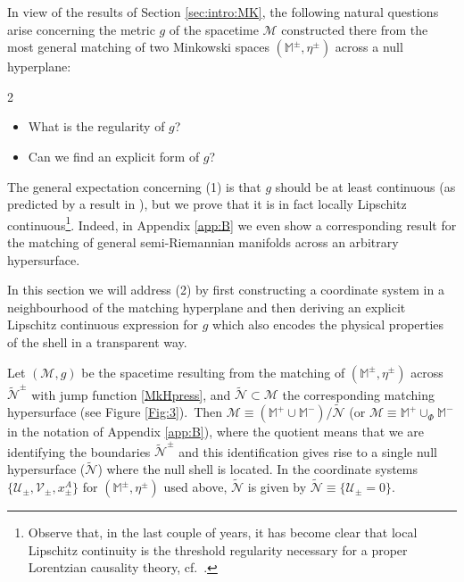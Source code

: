 \documentclass[11pt]{article}
\numberwithin{equation}{section}
\def\Mkp{\mathbb{M}^+}
\def\Mkm{\mathbb{M}^-}
\def\Mkpm{\mathbb{M}^{\pm}}
\def\flatpm{\eta^{\pm}}
\newcommand\N{\mathcal N}
\newcommand\M{\mathcal M}
\newcommand{\lp}{\left(}
\newcommand{\rp}{\right)}
\newcommand{\cu}{\mathcal{U}}
\newcommand{\cv}{\mathcal{V}}
\newcommand{\nullhyp}{\widetilde{\N}}
\begin{document}
In view of the results of Section \ref{sec:intro:MK}, the following natural questions arise 
concerning the metric $g$ of the spacetime $\M$ constructed there from the most general matching of two Minkowski spaces $(\Mkpm,\flatpm)$ across a null hyperplane:
\begin{multicols}{2}
\begin{itemize}\itemsep0cm
    \item[(1)] What is the regularity of $g$? 
    \item[(2)] Can we find an explicit form of $g$?
\end{itemize}
\end{multicols}
The general expectation concerning (1) is that $g$ should be at least continuous (as predicted by a result in \cite{clarke1987junction}), but we prove that it is in fact locally Lipschitz continuous\footnote{Observe that, in the last couple of years, it has become clear that local Lipschitz continuity is the threshold regularity necessary for a proper Lorentzian causality theory, cf.\ \cite{CG:12,GKSS:20}.}. Indeed, in Appendix \ref{app:B} we even show a corresponding result for the matching of general semi-Riemannian manifolds across an arbitrary hypersurface. 

In this section we will address (2) 
by first constructing a coordinate system in a neighbourhood of the matching hyperplane and then deriving an explicit Lipschitz continuous expression for $g$ which also encodes 
the physical properties of the shell in a transparent way. 


Let $(\M,g)$ be the spacetime resulting from the matching of $(\Mkpm, \flatpm)$ across $\nullhyp^{\pm}$ with jump function \eqref{MkHpress}, and $\nullhyp\subset\M$ the corresponding matching hypersurface (see Figure \ref{Fig:3}).\ Then $\M\equiv(\Mkp\cup \Mkm)/ \nullhyp$ (or $\M\equiv\Mkp \cup_{\Phi} \Mkm$ in the notation of Appendix \ref{app:B}), where the quotient means that we are identifying the boundaries $\nullhyp^{\pm}$ and this identification gives rise to a single null hypersurface ($\nullhyp$) where 
the null shell is located. In the coordinate systems  $\{\cu_{\pm},\cv_{\pm},x_{\pm}^A\}$ for $\lp\Mkpm,\flatpm\rp$ used above,  $\nullhyp$ is given by $\nullhyp\equiv\{\cu_{\pm}=0\}$. 
\end{document}
